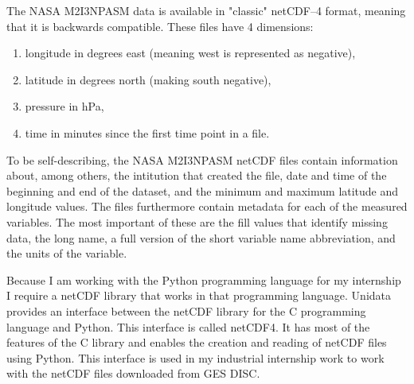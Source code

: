 \documentclass[../00_main.tex]{subfiles}
\begin{document}
The NASA M2I3NPASM data is available in "classic" netCDF--4 format, meaning that
it is backwards compatible. These files have 4 dimensions:
\begin{enumerate}
    \item longitude in degrees east (meaning west is represented as negative),
    \item latitude in degrees north (making south negative),
    \item pressure in hPa,
    \item time in minutes since the first time point in a file.
\end{enumerate}
To be self-describing, the NASA M2I3NPASM netCDF files contain information
about, among others, the intitution that created the file, date and time of the
beginning and end of the dataset, and the minimum and maximum latitude and
longitude values. 
The files furthermore contain metadata for each of the
measured variables. The most important of these are the fill values
that identify missing data, the long name, a full version 
of the short variable name abbreviation, and the units of the variable.
\newline

Because I am working with the Python programming language for my internship
I require a netCDF library that works in that programming language. Unidata
provides an interface between the netCDF library for the C programming language
and Python. This interface is called netCDF4. It has most of the features of
the C library and enables the creation and reading of netCDF files using
Python. This interface is used in my industrial internship work to work with
the netCDF files downloaded from GES DISC.
\end{document}
